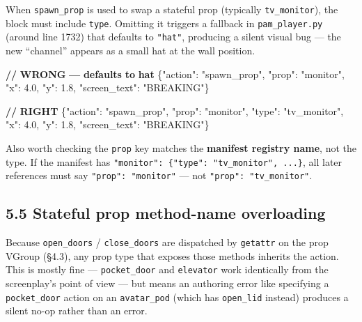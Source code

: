 \documentclass[
  11pt,
]{book}
\newenvironment{Shaded}{}{}
\newcommand{\DataTypeTok}[1]{\textcolor[rgb]{0.56,0.13,0.00}{#1}}
\newcommand{\ErrorTok}[1]{\textcolor[rgb]{1.00,0.00,0.00}{\textbf{#1}}}
\newcommand{\FloatTok}[1]{\textcolor[rgb]{0.25,0.63,0.44}{#1}}
\newcommand{\FunctionTok}[1]{\textcolor[rgb]{0.02,0.16,0.49}{#1}}
\newcommand{\StringTok}[1]{\textcolor[rgb]{0.25,0.44,0.63}{#1}}
\begin{document}
When \texttt{spawn\_prop} is used to swap a stateful prop (typically
\texttt{tv\_monitor}), the block must include \texttt{type}. Omitting it
triggers a fallback in \texttt{pam\_player.py} (around line 1732) that
defaults to \texttt{"hat"}, producing a silent visual bug --- the new
``channel'' appears as a small hat at the wall position.

\begin{Shaded}
\begin{Highlighting}[]
\ErrorTok{//} \ErrorTok{WRONG} \ErrorTok{—} \ErrorTok{defaults} \ErrorTok{to} \ErrorTok{hat}
\FunctionTok{\{}\DataTypeTok{"action"}\FunctionTok{:} \StringTok{"spawn\_prop"}\FunctionTok{,} \DataTypeTok{"prop"}\FunctionTok{:} \StringTok{"monitor"}\FunctionTok{,}
 \DataTypeTok{"x"}\FunctionTok{:} \FloatTok{4.0}\FunctionTok{,} \DataTypeTok{"y"}\FunctionTok{:} \FloatTok{1.8}\FunctionTok{,} \DataTypeTok{"screen\_text"}\FunctionTok{:} \StringTok{"BREAKING"}\FunctionTok{\}}

\ErrorTok{//} \ErrorTok{RIGHT}
\FunctionTok{\{}\DataTypeTok{"action"}\FunctionTok{:} \StringTok{"spawn\_prop"}\FunctionTok{,} \DataTypeTok{"prop"}\FunctionTok{:} \StringTok{"monitor"}\FunctionTok{,}
 \DataTypeTok{"type"}\FunctionTok{:} \StringTok{"tv\_monitor"}\FunctionTok{,}
 \DataTypeTok{"x"}\FunctionTok{:} \FloatTok{4.0}\FunctionTok{,} \DataTypeTok{"y"}\FunctionTok{:} \FloatTok{1.8}\FunctionTok{,} \DataTypeTok{"screen\_text"}\FunctionTok{:} \StringTok{"BREAKING"}\FunctionTok{\}}
\end{Highlighting}
\end{Shaded}

Also worth checking the \texttt{prop} key matches the \textbf{manifest
registry name}, not the type. If the manifest has
\texttt{"monitor":\ \{"type":\ "tv\_monitor",\ ...\}}, all later
references must say \texttt{"prop":\ "monitor"} --- not
\texttt{"prop":\ "tv\_monitor"}.

\subsection{5.5 Stateful prop method-name
overloading}\label{stateful-prop-method-name-overloading}

Because \texttt{open\_doors} / \texttt{close\_doors} are dispatched by
\texttt{getattr} on the prop VGroup (§4.3), any prop type that exposes
those methods inherits the action. This is mostly fine ---
\texttt{pocket\_door} and \texttt{elevator} work identically from the
screenplay's point of view --- but means an authoring error like
specifying a \texttt{pocket\_door} action on an \texttt{avatar\_pod}
(which has \texttt{open\_lid} instead) produces a silent no-op rather
than an error.
\end{document}
